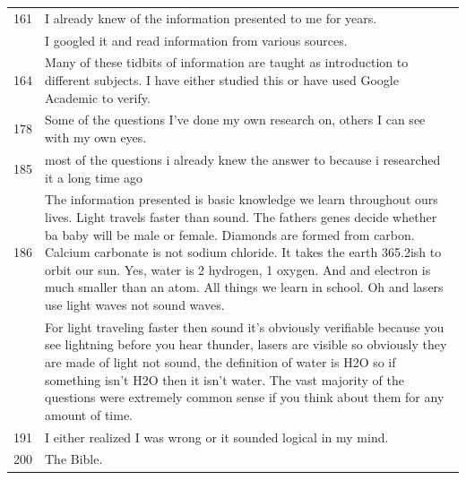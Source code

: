 \documentclass[
  doc,floatsintext]{apa6}
\begin{document}
\begin{longtable}[t]{>{}r>{\raggedright\arraybackslash}p{30em}}
161 & I already knew of the information presented to me for years.\\
\addlinespace
163 & I googled it and read information from various sources.\\
164 & Many of these tidbits of information are taught as introduction to different subjects. I have either studied this or have used Google  Academic to verify.\\
178 & Some of the questions I've done my own research on, others I can see with my own eyes.\\
185 & most of the questions i already knew the answer to because i researched it a long time ago\\
186 & The information presented is basic knowledge we learn throughout ours lives. Light travels faster than sound. The fathers genes decide whether ba baby will be male or female. Diamonds are formed from carbon. Calcium carbonate is not sodium chloride. It takes the earth 365.2ish to orbit our sun. Yes, water is 2 hydrogen, 1 oxygen. And and electron is much smaller than an atom. All things we learn in school. Oh and lasers use light waves not sound waves.\\
\addlinespace
187 & For light traveling faster then sound it's obviously verifiable because you see lightning before you hear thunder, lasers are visible so obviously they are made of light not sound, the definition of water is H2O so if something isn't H2O then it isn't water.  The vast majority of the questions were extremely common sense if you think about them for any amount of time.\\
191 & I either realized I was wrong or it sounded logical in my mind.\\
200 & The Bible.\\
\bottomrule
\end{longtable}
\end{document}
